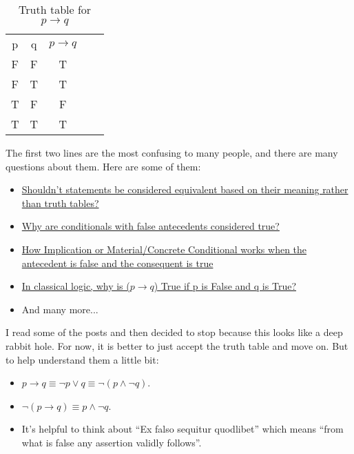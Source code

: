 \documentclass[12pt, letterpaper, oneside]{book}
\begin{document}
\begin{table}[H]
  \centering
  \begin{tabular}{|c|c|c|ll}
    \cline{1-3}
    p & q & $p \rightarrow q$ &  & \\ [1ex] \cline{1-3}
    F & F & T                 &  & \\ [0.5ex] \cline{1-3}
    F & T & T                 &  & \\ [0.5ex] \cline{1-3}
    T & F & F                 &  & \\ [0.5ex] \cline{1-3}
    T & T & T                 &  & \\ [0.5ex] \cline{1-3}
  \end{tabular}
  \caption{Truth table for $p \rightarrow q$}
\end{table}

The first two lines are the most confusing to many people, and there are many
questions about them. Here are some of them:
\begin{itemize}
  \item \href{https://philosophy.stackexchange.com/q/26719/44172}{Shouldn't statements be considered equivalent based on their meaning rather than truth tables?}
  \item \href{https://philosophy.stackexchange.com/q/34082/44172}{Why are conditionals with false antecedents considered true?}
  \item \href{https://math.stackexchange.com/q/3098664/665777}{How Implication or Material/Concrete Conditional works when the antecedent is false and the consequent is true}
  \item \href{https://math.stackexchange.com/q/70736/665777}{In classical logic, why is ($p \rightarrow q$) True if p is False and q is True?}
  \item And many more...
\end{itemize}

I read some of the posts and then decided to stop because this looks like a
deep rabbit hole. For now, it is better to just accept the truth table and move
on. But to help understand them a little bit:
\begin{itemize}
  \item $p \rightarrow q \equiv \lnot p \lor q \equiv \lnot (p \land \lnot q)$.
  \item $\lnot (p \rightarrow q) \equiv p \land \lnot q$.
  \item It's helpful to think about ``Ex falso sequitur quodlibet'' which means
        ``from what is false any assertion validly follows''.
\end{itemize}
\end{document}
